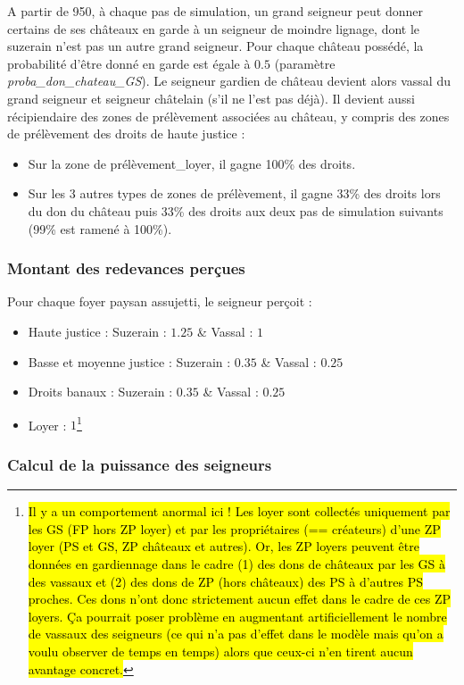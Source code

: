 \documentclass[a4paper,11pt]{article}
\newcommand{\hlc}[2][yellow]{ {\sethlcolor{#1} \hl{#2}} }
\begin{document}
{A partir de 950, à chaque pas de simulation, un grand seigneur peut donner certains de ses châteaux en garde à un seigneur de moindre lignage, dont le suzerain n'est pas un autre grand seigneur. Pour chaque château possédé, la probabilité d'être donné en garde est égale à $0.5$ (paramètre \textit{proba\_don\_chateau\_GS}). Le seigneur gardien de château devient alors vassal du grand seigneur et seigneur châtelain (s'il ne l'est pas déjà). Il devient aussi récipiendaire des zones de prélèvement associées au château, y compris des zones de prélèvement des droits de haute justice :
\begin{itemize}
\item Sur la zone de prélèvement\_loyer, il gagne 100\% des droits.
\item Sur les 3 autres types de zones de prélèvement, il gagne 33\% des droits lors du don du château puis 33\% des droits aux deux pas de simulation suivants (99\% est ramené à 100\%).
\end{itemize}


\subsubsection{Montant des redevances perçues}
Pour chaque foyer paysan assujetti, le seigneur perçoit :
\begin{itemize}
	\item Haute justice : Suzerain : $1.25$ \& Vassal : $1$
	\item Basse et moyenne justice : Suzerain : $0.35$ \& Vassal : $0.25$
	\item Droits banaux : Suzerain : $0.35$ \& Vassal : $0.25$
	\item Loyer : $1$\footnote{\hlc[lightred]{Il y a un comportement anormal ici ! Les loyer sont collectés uniquement par les GS (FP hors ZP loyer) et par les propriétaires (== créateurs) d'une ZP loyer (PS et GS, ZP châteaux et autres). Or, les ZP loyers peuvent être données en gardiennage dans le cadre (1) des dons de châteaux par les GS à des vassaux et (2) des dons de ZP (hors châteaux) des PS à d'autres PS proches. Ces dons n'ont donc strictement aucun effet dans le cadre de ces ZP loyers. Ça pourrait poser problème en augmentant artificiellement le nombre de vassaux des seigneurs (ce qui n'a pas d'effet dans le modèle mais qu'on a voulu observer de temps en temps) alors que ceux-ci n'en tirent aucun avantage concret.}}
\end{itemize}
\subsubsection{Calcul de la puissance des seigneurs}

}
\end{document}
